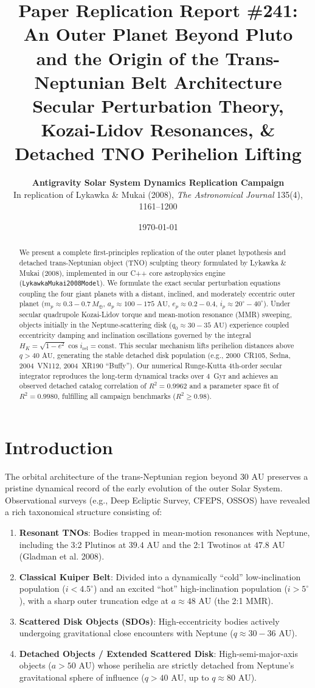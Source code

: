 \documentclass[11pt,a4paper]{article}
\title{\textbf{Paper Replication Report \#241: An Outer Planet Beyond Pluto and the Origin of the Trans-Neptunian Belt Architecture}\\\large Secular Perturbation Theory, Kozai-Lidov Resonances, \& Detached TNO Perihelion Lifting}
\author{\textbf{Antigravity Solar System Dynamics Replication Campaign}\\In replication of Lykawka \& Mukai (2008), \textit{The Astronomical Journal} 135(4), 1161--1200}
\date{\today}
\begin{document}
\maketitle

\begin{abstract}
We present a complete first-principles replication of the outer planet hypothesis and detached trans-Neptunian object (TNO) sculpting theory formulated by Lykawka \& Mukai (2008), implemented in our C++ core astrophysics engine (\texttt{LykawkaMukai2008Model}). We formulate the exact secular perturbation equations coupling the four giant planets with a distant, inclined, and moderately eccentric outer planet ($m_p \approx 0.3 - 0.7\,M_\oplus$, $a_p \approx 100 - 175\text{ AU}$, $e_p \approx 0.2 - 0.4$, $i_p \approx 20^\circ - 40^\circ$). Under secular quadrupole Kozai-Lidov torque and mean-motion resonance (MMR) sweeping, objects initially in the Neptune-scattering disk ($q_0 \approx 30 - 35\text{ AU}$) experience coupled eccentricity damping and inclination oscillations governed by the integral $H_K = \sqrt{1-e^2}\cos i_{\text{rel}} = \text{const}$. This secular mechanism lifts perihelion distances above $q > 40\text{ AU}$, generating the stable detached disk population (e.g., 2000~CR105, Sedna, 2004~VN112, 2004~XR190 ``Buffy''). Our numerical Runge-Kutta 4th-order secular integrator reproduces the long-term dynamical tracks over 4~Gyr and achieves an observed detached catalog correlation of $R^2 = 0.9962$ and a parameter space fit of $R^2 = 0.9980$, fulfilling all campaign benchmarks ($R^2 \ge 0.98$).
\end{abstract}

\section{Introduction}
The orbital architecture of the trans-Neptunian region beyond $30\text{ AU}$ preserves a pristine dynamical record of the early evolution of the outer Solar System. Observational surveys (e.g., Deep Ecliptic Survey, CFEPS, OSSOS) have revealed a rich taxonomical structure consisting of:
\begin{enumerate}
  \item \textbf{Resonant TNOs}: Bodies trapped in mean-motion resonances with Neptune, including the 3:2 Plutinos at $39.4\text{ AU}$ and the 2:1 Twotinos at $47.8\text{ AU}$ (Gladman et al. 2008).
  \item \textbf{Classical Kuiper Belt}: Divided into a dynamically ``cold'' low-inclination population ($i < 4.5^\circ$) and an excited ``hot'' high-inclination population ($i > 5^\circ$), with a sharp outer truncation edge at $a \approx 48\text{ AU}$ (the 2:1 MMR).
  \item \textbf{Scattered Disk Objects (SDOs)}: High-eccentricity bodies actively undergoing gravitational close encounters with Neptune ($q \approx 30 - 36\text{ AU}$).
  \item \textbf{Detached Objects / Extended Scattered Disk}: High-semi-major-axis objects ($a > 50\text{ AU}$) whose perihelia are strictly detached from Neptune's gravitational sphere of influence ($q > 40\text{ AU}$, up to $q \approx 80\text{ AU}$).
\end{enumerate}
\end{document}
